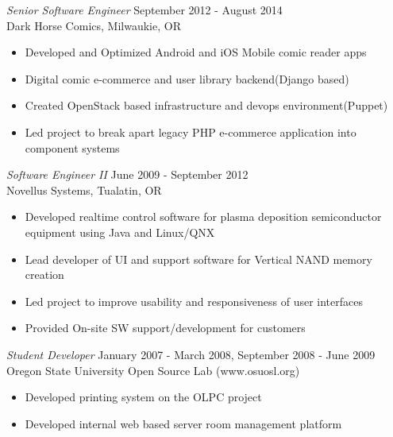 \documentclass[margin]{res}
\begin{document}
\begin{resume}
                {\sl Senior Software Engineer} \hfill September 2012 - August 2014 \\
                Dark Horse Comics, Milwaukie, OR
                 \begin{itemize}  \itemsep -2pt %
                    \item Developed and Optimized Android and iOS Mobile comic reader apps
                       \item Digital comic e-commerce and user library backend(Django based)
                      \item Created OpenStack based infrastructure and devops environment(Puppet)
                    \item Led project to break apart legacy PHP e-commerce application into component systems
                \end{itemize}

                {\sl Software Engineer II} \hfill June 2009 -  September 2012 \\
                Novellus Systems,  Tualatin, OR 
                 \begin{itemize}  \itemsep -2pt
                    \item Developed realtime control software for plasma deposition semiconductor equipment using Java and Linux/QNX
                    \item Lead developer of UI and support software for Vertical NAND memory creation 
                    \item Led project to improve usability and responsiveness of user interfaces
                    \item Provided On-site SW support/development for customers
                \end{itemize}
                
                {\sl Student Developer} \hfill            January 2007 - March 2008, September 2008 - June 2009 \\
                Oregon State University Open Source Lab (www.osuosl.org)
                 \begin{itemize}  \itemsep -2pt %
                     \item Developed printing system on the OLPC project
                     \item Developed internal web based server room management platform
                 \end{itemize}


\end{resume}
\end{document}
